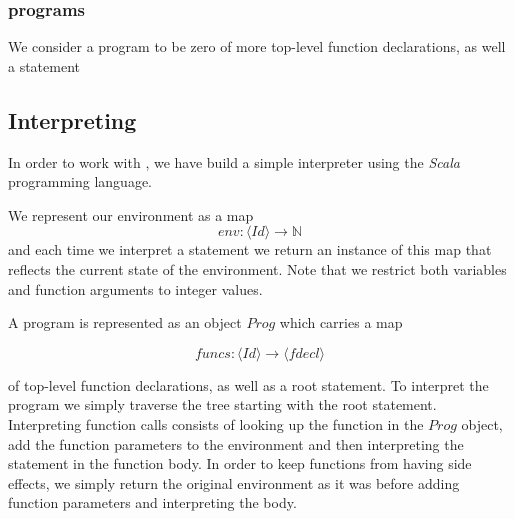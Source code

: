 \fi

\subsubsection{programs}

We consider a program to be zero of more top-level function declarations, as well a statement

\subsection{Interpreting \simpl}

In order to work with \simpl, we have build a simple interpreter using the \emph{Scala} programming language.

 We represent our environment as a map 
\begin{equation}
	env: \langle Id \rangle   \rightarrow \mathbb{N}
\end{equation}
and each time we interpret a statement we return an instance of this map that reflects the current state of the environment. Note that we restrict both variables and function arguments to integer values. 

A program is represented as an object $Prog$ which carries a map

\begin{equation*}
	funcs: \langle Id \rangle \rightarrow \langle fdecl \rangle
\end{equation*}

of top-level function declarations, as well as a root statement. To interpret the program we simply traverse the tree starting with the root statement. Interpreting function calls consists of looking up the function in the $Prog$ object, add the function parameters to the environment and then interpreting the statement in the function body. In order to keep functions from having side effects, we simply return the original environment as it was before adding function parameters and interpreting the body. 